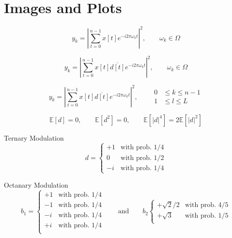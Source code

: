 \chapter{Images and Plots}






\begin{equation*}
  y_k = \left| \sum_{t=0}^{n-1} x[t] e^{-i2\pi\omega_kt} \right|^2 , \qquad \omega_k \in \Omega
\end{equation*}

\begin{equation*}
  y_k = \left| \sum_{t=0}^{n-1} x[t]\overline{d[t]} e^{-i2\pi\omega_kt} \right|^2 , \qquad \omega_k \in \Omega
\end{equation*}

\begin{equation*}
  y_k = \left| \sum_{t=0}^{n-1} x[t]\overline{d[t]} e^{-i2\pi\omega_kt} \right|^2 , \qquad \begin{split}
  0 &\leq k \leq n-1\\
  1 &\leq l \leq L
  \end{split}
\end{equation*}

\begin{equation*}
  \mathbb{E}\left[d\right] = 0, \qquad \mathbb{E}\left[d^2\right] = 0, \qquad\mathbb{E}\left[\left|d\right|^4\right] = 2\mathbb{E}\left[\left|d\right|^2\right]
\end{equation*}

Ternary Modulation
\begin{equation*}
  d =
      \begin{cases}
          +1 & \text{with prob.  $1/4$}\\
          0 & \text{with prob.  $1/2$}\\
          -i & \text{with prob.  $1/4$}
      \end{cases}  
\end{equation*}





Octanary Modulation
\begin{equation*}
  b_1 =
      \begin{cases}
          +1 & \text{with prob.  $1/4$}\\
          -1 & \text{with prob.  $1/4$}\\
          -i & \text{with prob.  $1/4$}\\
          +i & \text{with prob.  $1/4$}\\

      \end{cases}  
      \qquad \text{and} \qquad 
  b_2 
      \begin{cases}  
        +\sqrt{2}/2 & \text{with prob.  $4/5$}\\
        +\sqrt{3} & \text{with prob.  $1/5$}\\
    \end{cases}   
\end{equation*}







